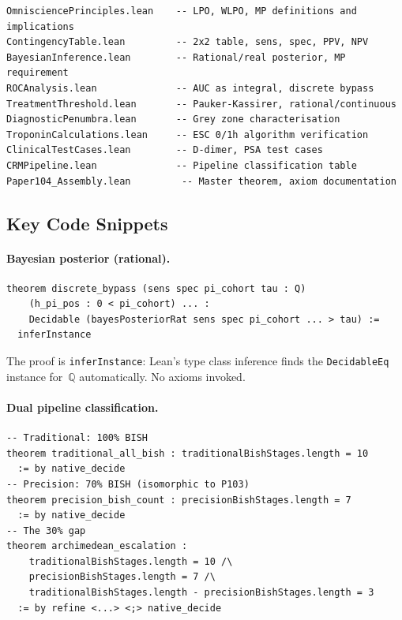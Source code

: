 \documentclass[11pt,a4paper]{article}
\theoremstyle{plain}
\theoremstyle{definition}
\newcommand{\Q}{\mathbb{Q}}
\begin{document}
\begin{tcolorbox}[leanbox={P104\_DiagnosticTesting/ — Module Structure}]
\begin{lstlisting}
OmnisciencePrinciples.lean    -- LPO, WLPO, MP definitions and implications
ContingencyTable.lean         -- 2x2 table, sens, spec, PPV, NPV
BayesianInference.lean        -- Rational/real posterior, MP requirement
ROCAnalysis.lean              -- AUC as integral, discrete bypass
TreatmentThreshold.lean       -- Pauker-Kassirer, rational/continuous
DiagnosticPenumbra.lean       -- Grey zone characterisation
TroponinCalculations.lean     -- ESC 0/1h algorithm verification
ClinicalTestCases.lean        -- D-dimer, PSA test cases
CRMPipeline.lean              -- Pipeline classification table
Paper104_Assembly.lean         -- Master theorem, axiom documentation
\end{lstlisting}
\end{tcolorbox}

\subsection{Key Code Snippets}

\paragraph{Bayesian posterior (rational).}

\begin{tcolorbox}[leanbox={BayesianInference.lean — Discrete Bypass}]
\begin{lstlisting}
theorem discrete_bypass (sens spec pi_cohort tau : Q)
    (h_pi_pos : 0 < pi_cohort) ... :
    Decidable (bayesPosteriorRat sens spec pi_cohort ... > tau) :=
  inferInstance
\end{lstlisting}
\end{tcolorbox}

The proof is \texttt{inferInstance}: Lean's type class inference finds the \texttt{DecidableEq} instance for~$\Q$ automatically.  No axioms invoked.

\paragraph{Dual pipeline classification.}

\begin{tcolorbox}[leanbox={CRMPipeline.lean — Archimedean Escalation}]
\begin{lstlisting}
-- Traditional: 100% BISH
theorem traditional_all_bish : traditionalBishStages.length = 10
  := by native_decide
-- Precision: 70% BISH (isomorphic to P103)
theorem precision_bish_count : precisionBishStages.length = 7
  := by native_decide
-- The 30% gap
theorem archimedean_escalation :
    traditionalBishStages.length = 10 /\
    precisionBishStages.length = 7 /\
    traditionalBishStages.length - precisionBishStages.length = 3
  := by refine <...> <;> native_decide
\end{lstlisting}
\end{tcolorbox}
\end{document}
